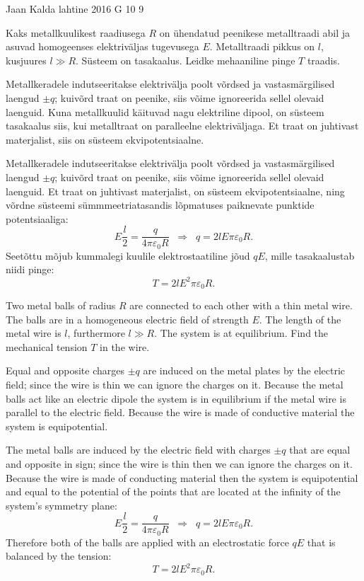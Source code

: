 {Jaan Kalda} %
{lahtine} %
{2016} %
{G 10} %
{9} %
{
\ifStatement
Kaks metallkuulikest raadiusega $R$ on ühendatud peenikese metalltraadi abil ja asuvad homogeenses 
elektriväljas tugevusega $E$. Metalltraadi pikkus on $l$, kusjuures $l\gg R$. 
Süsteem on tasakaalus. Leidke mehaaniline pinge $T$ traadis.
\fi


\ifHint
Metallkeradele indutseeritakse elektrivälja poolt võrdsed ja vastasmärgilised laengud $\pm q$; kuivõrd traat on peenike,
siis võime ignoreerida sellel olevaid laenguid. Kuna metallkuulid käituvad nagu elektriline dipool, on süsteem tasakaalus siis, kui metalltraat on paralleelne elektriväljaga. Et traat on juhtivast materjalist, siis on süsteem ekvipotentsiaalne.
\fi


\ifSolution
Metallkeradele indutseeritakse elektrivälja poolt võrdsed ja vastasmärgilised laengud $\pm q$; kuivõrd traat on peenike,
siis võime ignoreerida sellel olevaid laenguid. Et traat on juhtivast materjalist, on süsteem ekvipotentsiaalne,
ning võrdne süsteemi sümmmeetriatasandis lõpmatuses paiknevate punktide potentsiaaliga:
$$E\frac l2=\frac q{4\pi\varepsilon_0R}\;\;\Rightarrow\;\; q=2lE\pi\varepsilon_0R.$$
Seetõttu mõjub kummalegi kuulile elektrostaatiline jõud $qE$, mille tasakaalustab niidi pinge:
$$T=2lE^2\pi\varepsilon_0R.$$
\fi


\ifEngStatement
Two metal balls of radius $R$ are connected to each other with a thin metal wire. The balls are in a homogeneous electric field of strength $E$. The length of the metal wire is $l$, furthermore $l\gg R$. The system is at equilibrium. Find the mechanical tension $T$ in the wire.
\fi


\ifEngHint
Equal and opposite charges $\pm q$ are induced on the metal plates by the electric field; since the wire is thin we can ignore the charges on it. Because the metal balls act like an electric dipole the system is in equilibrium if the metal wire is parallel to the electric field. Because the wire is made of conductive material the system is equipotential.
\fi


\ifEngSolution
The metal balls are induced by the electric field with charges $\pm q$ that are equal and opposite in sign; since the wire is thin then we can ignore the charges on it. Because the wire is made of conducting material then the system is equipotential and equal to the potential of the points that are located at the infinity of the system’s symmetry plane:
$$E\frac l2=\frac q{4\pi\varepsilon_0R}\;\;\Rightarrow\;\; q=2lE\pi\varepsilon_0R.$$ 
Therefore both of the balls are applied with an electrostatic force $qE$ that is balanced by the tension:
$$T=2lE^2\pi\varepsilon_0R.$$
\fi
}